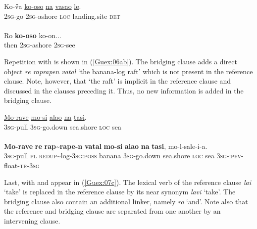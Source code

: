 \documentclass[output=paper]{LSP/langsci}
\begin{document}
\begin{exe}
\ex \label{Guex:05ab}
\begin{xlist}
\ex \label{Guex:05a}
\gll Ko-\H{v}a    \underline{ko-oso}         \underline{na}     \underline{vasao}          \underline{le}.\\
\textsc{2sg}-go   \textsc{2sg}-ashore   \textsc{loc}    landing.site   \textsc{det}\\
\glt {}\\
\ex \label{Guex:05b}
\gll Ro \textbf{ko-oso}        ko-on...\\     	       
    then   \textsc{2sg}-ashore   \textsc{2sg}-see \\
\glt {} 
\end{xlist}
\end{exe}


Repetition with  is shown in (\ref{Guex:06ab}). The bridging clause adds a direct object \textit{re raprapen vatal} `the banana-log raft' which is not present in the reference clause. Note, however, that `the raft' is implicit in the reference clause and discussed in the clauses preceding it. Thus, no new information is added in the bridging clause.

\begin{exe}
\ex \label{Guex:06ab}
\begin{xlist}
\ex \label{Guex:06a}
\gll \underline{Mo-rave}   \underline{mo-si}    \underline{alao}    \underline{na}  \underline{tasi}.\\
\textsc{3sg}-pull    \textsc{3sg}-go.down  sea.shore  \textsc{loc}  sea\\
\glt {}\\
\ex \label{Guex:06b}
\gll \textbf{Mo-rave}  \textbf{re}  \textbf{rap{\textasciitilde}rape-n}    \textbf{vatal}        \textbf{mo-si} \textbf{alao}    \textbf{na}  \textbf{tasi}, mo-l-sale-i-a.\\     	       
\textsc{3sg}-pull  \textsc{pl}  \textsc{redup}{\textasciitilde}log-\textsc{3sg:poss} banana  \textsc{3sg}-go.down  sea.shore \textsc{loc} sea  \textsc{3sg-ipfv}-float-\textsc{tr-3sg} \\
\glt {} 
\end{xlist}
\end{exe}

Last,  with  and  appear in (\ref{Guex:07c}). The lexical verb of the reference clause \textit{lai} `take' is replaced in the reference clause by its near synonym \textit{lavi} `take'. The bridging clause also contain an additional linker, namely \textit{ro} `and'.  Note also that the reference and bridging clause are separated from one another by an intervening clause.
\end{document}
